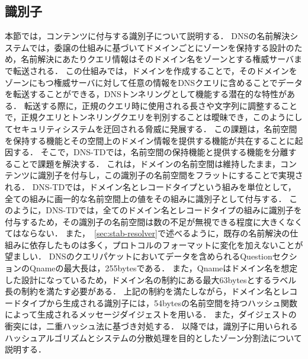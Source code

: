 \subsection{識別子}
本節では，コンテンツに付与する識別子について説明する．
DNSの名前解決システムでは，委譲の仕組みに基づいてドメインごとにゾーンを保持する設計のため，名前解決にあたりクエリ情報はそのドメイン名をゾーンとする権威サーバまで転送される．
この仕組みでは，ドメインを作成することで，そのドメインをゾーンにもつ権威サーバに対して任意の情報をDNSクエリに含めることでデータを転送することができる，DNSトンネリングとして機能する潜在的な特性がある．
転送する際に，正規のクエリ時に使用される長さや文字列に調整することで，正規クエリとトンネリングクエリを判別することは曖昧でき，このようにしてセキュリティシステムを迂回される脅威に発展する．
この課題は，名前空間を保持する機能とその空間上のドメイン情報を提供する機能が共在することに起因する．
そこで，DNS-TDでは，名前空間の保持機能と提供する機能を分離することで課題を解決する．
これは，ドメインの名前空間は維持したまま，コンテンツに識別子を付与し，この識別子の名前空間をフラットにすることで実現される．
DNS-TDでは，ドメイン名とレコードタイプという組みを単位として，全ての組みに画一的な名前空間上の値をその組みに識別子として付与する．
このように，DNS-TDでは，全てのドメイン名とレコードタイプの組みに識別子を付与するため，その識別子の名前空間は数の不足が無視できる程度に大きくなくてはならない．
また，~\ref{sec:stab-resolver}で述べるように，既存の名前解決の仕組みに依存したものは多く，プロトコルのフォーマットに変化を加えないことが望ましい．
DNSのクエリパケットにおいてデータを含められるQuestionセクションのQnameの最大長は，255bytesである．
また，Qnameはドメイン名を想定した設計になっているため，ドメイン名の制約にある最大63bytesとするラベル長の制約を満たす必要がある．
上記の制約を満たしながら，ドメイン名とレコードタイプから生成される識別子には，54bytesの名前空間を持つハッシュ関数によって生成されるメッセージダイジェストを用いる．
また，ダイジェストの衝突には，二重ハッシュ法に基づき対処する．
以降では，識別子に用いられるハッシュアルゴリズムとシステムの分散処理を目的としたゾーン分割法について説明する．

